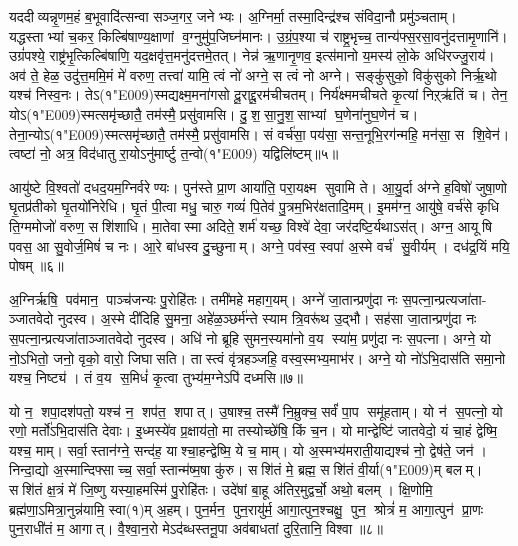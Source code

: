 यददीव्यन्नृ॒णम॒हं ब॒भूवादि॑त्सन्वा सञ्ज॒गर॒ जनेभ्यः। अ॒ग्निर्मा॒ तस्मा॒दिन्द्र॑श्च संविदा॒नौ प्रमु॑ञ्चताम्। यद्धस्ताभ्यां च॒कर॒ किल्बि॑षाण्य॒क्षाणां व॒ग्नुमु॑प॒जिघ्न॑मानः। उ॒ग्रं॒प॒श्या च॑ राष्ट्र॒भृच्च॒ तान्य॑फ्स॒रसा॒वनु॑दत्तामृ॒णानि॑। उग्रं॑पश्ये॒ राष्ट्र॑भृ॒त्किल्बि॑षाणि॒ यद॒क्षवृ॑त्त॒मनु॑दत्तमे॒तत्। नेन्न॑ ऋ॒णानृ॒णव॒ इत्स॑मानो य॒मस्य॑ लो॒के अधि॑रज्जु॒राय॑। अव॑ ते॒ हेळ॒ उदु॑त्त॒ममि॒मं मे॑ वरुण॒ तत्त्वा॑ यामि॒ त्वं नो॑ अग्ने॒ स त्वं नो अग्ने। सङ्कु॑सुको॒ विकु॑सुको निर्\mbox{}ऋ॒थो यश्च॑ निस्व॒नः। तेऽ(१\char"E009)स्मद्यक्ष्म॒मना॑गसो दू॒राद्दू॒रम॑चीचतम्। निर्य॑क्ष्ममचीचते कृ॒त्यां निऱ्ऋ॑तिं च। तेन॒ योऽ(१\char"E009)स्मत्समृ॑च्छातै॒ तम॑स्मै॒ प्रसु॑वामसि। दु॒श॒सा॒नु॒श॒साभ्यां घ॒णेना॑नुघ॒णेन॑ च। तेना॒न्योऽ(१\char"E009)स्मत्समृ॑च्छातै॒ तम॑स्मै॒ प्रसु॑वामसि। सं वर्च॑सा॒ पय॑सा॒ सन्त॒नूभि॒रग॑न्महि॒ मन॑सा॒ स शि॒वेन॑। त्वष्टा॑ नो॒ अत्र॒ विद॑धातु रा॒योऽनु॑मार्ष्टु त॒न्वो(१\char"E009) यद्विलि॑ष्टम्॥५॥\anuvakamend


आयु॑ष्टे वि॒श्वतो॑ दधद॒यम॒ग्निर्वरेण्यः। पुन॑स्ते प्रा॒ण आया॑ति॒ परा॒यक्ष्म सुवामि ते। आ॒यु॒र्दा अ॑ग्ने ह॒विषो॑ जुषा॒णो घृ॒तप्र॑तीको घृ॒तयो॑निरेधि। घृ॒तं पी॒त्वा मधु॒ चारु॒ गव्यं॑ पि॒तेव॑ पु॒त्रम॒भिर॑क्षतादि॒मम्। इ॒मम॑ग्न॒ आयु॑षे॒ वर्च॑से कृधि ति॒ग्ममोजो॑ वरुण॒ सशि॑शाधि। मा॒तेवास्मा अदिते॒ शर्म॑ यच्छ॒ विश्वे॑ देवा॒ जर॑दष्टि॒र्यथाऽस॑त्। अग्न॒ आयूषि पवस॒ आ सु॒वोर्ज॒मिषं॑ च नः। आ॒रे बा॑धस्व दु॒च्छुनाम्। अग्ने॒ पव॑स्व॒ स्वपा॑ अ॒स्मे वर्च॑ सु॒वीर्यम्। दध॑द्र॒यिं मयि॒ पोषम्॥६॥

अ॒ग्निर्\mbox{}ऋषि॒ पव॑मान॒ पाञ्च॑जन्यः पु॒रोहि॑तः। तमी॑महे महाग॒यम्। अग्ने॑ जा॒तान्प्रणु॑दा नः स॒पत्ना॒न्प्रत्यजा॑ता- ञ्जातवेदो नुदस्व। अ॒स्मे दी॑दिहि सु॒मना॒ अहे॑ळ॒ञ्छर्म॑न्ते स्याम त्रि॒वरू॑थ उ॒द्भौ। सह॑सा जा॒तान्प्रणु॑दा नः स॒पत्ना॒न्प्रत्यजा॑ताञ्जातवेदो नुदस्व। अधि॑ नो ब्रूहि सुमन॒स्यमा॑नो व॒य स्या॑म॒ प्रणु॑दा नः स॒पत्ना\sn{}। अग्ने॒ यो नो॒ऽभितो॒ जनो॒ वृको॒ वारो॒ जिघासति। तास्त्वं वृ॑त्रहञ्जहि॒ वस्व॒स्मभ्य॒माभ॑र। अग्ने॒ यो नो॑ऽभि॒दास॑ति समा॒नो यश्च॒ निष्ट्य॑। तं व॒य स॒मिधं॑ कृ॒त्वा तुभ्य॑म॒ग्नेऽपि॑ दध्मसि॥७॥

यो न॒ शपा॒दश॑पतो॒ यश्च॑ न॒ शप॑त॒ शपात्। उ॒षाश्च॒ तस्मै॑ नि॒म्रुक्च॒ सर्वं॑ पा॒प समू॑हताम्। यो न॑ स॒पत्नो॒ यो रणो॒ मर्तो॑ऽभि॒दास॑ति देवाः। इ॒ध्मस्ये॑व प्र॒क्षाय॑तो॒ मा तस्योच्छे॑षि॒ किं च॒न। यो मान्द्वेष्टि॑ जातवेदो॒ यं चा॒हं द्वेष्मि॒ यश्च॒ माम्। सर्वा॒स्तान॑ग्ने॒ सन्द॑ह॒ याश्चा॒हन्द्वेष्मि॒ ये च॒ माम्। यो अ॒स्मभ्य॑मराती॒याद्यश्च॑ नो॒ द्वेष॑ते॒ जन॑। निन्दा॒द्यो अ॒स्मान्दिफ्साच्च॒ सर्वा॒स्तान्म॑ष्म॒षा कु॑रु। सशि॑तं मे॒ ब्रह्म॒ सशि॑तं वी॒र्या(१\char"E009)म् बलम्। सशि॑तं क्ष॒त्रं मे॑ जि॒ष्णु यस्या॒हमस्मि॑ पु॒रोहि॑तः। उदे॑षां बा॒हू अ॑तिर॒मुद्वर्चो॒ अथो॒ बलम्। क्षि॒णोमि॒ ब्रह्म॑णा॒ऽमित्रा॒नुन्न॑यामि॒ स्वा(१)म् अ॒हम्। पुन॒र्मन॒ पुन॒रायु॑र्म॒ आगा॒त्पुन॒श्चक्षु॒ पुन॒ श्रोत्रं॑ म॒ आगा॒त्पुन॑ प्रा॒णः पुन॒राधी॑तं म॒ आगात्। वै॒श्वा॒न॒रो मेऽद॑ब्धस्तनू॒पा अव॑बाधतां दुरि॒तानि॒ विश्वा॥८॥\anuvakamend

